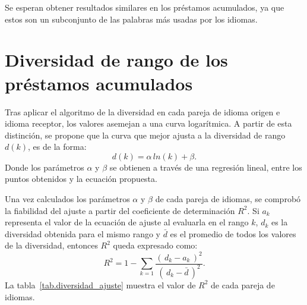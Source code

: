 Se esperan obtener resultados similares en los préstamos acumulados, ya que estos son un subconjunto de las palabras más usadas por los idiomas. 

\section{Diversidad de rango de los préstamos acumulados}

Tras aplicar el algoritmo de la diversidad en cada pareja de idioma origen e idioma receptor, los valores asemejan a una curva logarítmica.  A partir de esta distinción, se propone que la curva que mejor ajusta a la diversidad de rango $d(k)$, es de la forma:
\begin{equation}
\label{ec.ajuste} 
d(k) =  \alpha \, ln(k) + \beta.
\end{equation}
Donde los parámetros $\alpha$ y $\beta$  se  obtienen a través de una regresión lineal, entre los puntos obtenidos y la ecuación propuesta. 

Una vez calculados los parámetros $\alpha$ y $\beta$ de cada pareja de idiomas, se comprobó la fiabilidad del ajuste a partir del coeficiente de determinación $R^{2}$. Si $a_{k}$  representa el valor de la ecuación de ajuste al evaluarla en el rango $k$,  $d_{k}$ es la diversidad obtenida para el mismo rango y $\bar{d}$ es el promedio de todos los valores de la diversidad, entonces $R^{2}$ queda expresado como:
\begin{equation}
R^{2} = 1 - \sum_{k = 1} \frac{ \left( \,d_{k} - a_{k} \,\right)^{2}  }{ \left( \, d_{k} - \bar{d} \,\right)^{2} }.	
\label{ec.r2_diversidad}
\end{equation}
La tabla~\ref{tab.diversidad_ajuste} muestra el valor de $R^{2}$ de cada pareja de idiomas. 

  

